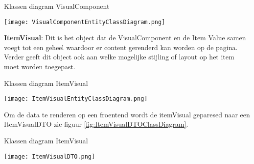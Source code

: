 \whitespace[2]
\begin{graphic}
    \captionsetup{type=figure}
    \caption{Klassen diagram VisualComponent}
    \texttt{[image: VisualComponentEntityClassDiagram.png]}
    \label{fig:VisualComponentEntityClassDiagram}
\end{graphic}

\whitespace[2]
\textbf{ItemVisual}: Dit is het object dat de VisualComponent en de Item Value samen voegt tot een geheel waardoor er content gerenderd kan worden op de pagina.
Verder geeft dit object ook aan welke mogelijke stijling of layout op het item moet worden toegepast.

\whitespace[2]
\begin{graphic}
	\captionsetup{type=figure}
	\caption{Klassen diagram ItemVisual}
	\texttt{[image: ItemVisualEntityClassDiagram.png]}
	\label{fig:ItemVisualEntityClassDiagram}
\end{graphic}

\whitespace[2]
Om de data te renderen op een froentend wordt de itemVisual geparesed naar een ItemVisualDTO zie figuur \ref{fig:ItemVisualDTOClassDiagram}.

\whitespace[2]
\begin{graphic}
	\captionsetup{type=figure}
	\caption{Klassen diagram ItemVisual}
	\texttt{[image: ItemVisualDTO.png]}
	\label{fig:ItemVisualDTOClassDiagram}

\end{graphic}

